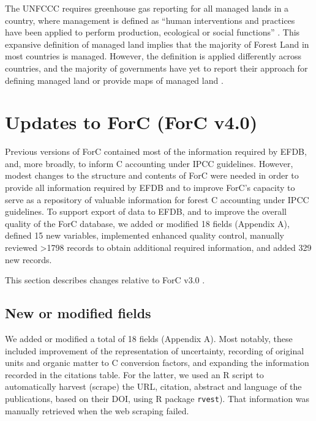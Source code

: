 \documentclass[, manuscript]{copernicus}
\begin{document}
The UNFCCC requires greenhouse gas reporting for all managed lands in a
country, where management is defined as ``human interventions and
practices have been applied to perform production, ecological or social
functions'' \citep{ipcc_2006_2006}. This expansive definition of managed
land implies that the majority of Forest Land in most countries is
managed. However, the definition is applied differently across
countries, and the majority of governments have yet to report their
approach for defining managed land or provide maps of managed land
\citep{ogle_delineating_2018, deng_comparing_2021}.

\section{Updates to ForC (ForC v4.0)}

Previous versions of ForC
\citep{anderson-teixeira_carbon_2016, anderson-teixeira_forc_2018, anderson-teixeira_carbon_2021}
contained most of the information required by EFDB, and, more broadly,
to inform C accounting under IPCC guidelines. However, modest changes to
the structure and contents of ForC were needed in order to provide all
information required by EFDB and to improve ForC's capacity to serve as
a repository of valuable information for forest C accounting under IPCC
guidelines. To support export of data to EFDB, and to improve the
overall quality of the ForC database, we added or modified 18 fields
(Appendix A), defined 15 new variables, implemented enhanced quality
control, manually reviewed \textgreater1798 records to obtain additional
required information, and added 329 new records.

This section describes changes relative to ForC v3.0
\citep{anderson-teixeira_carbon_2021}.

\subsection{New or modified fields}

We added or modified a total of 18 fields (Appendix A). Most notably,
these included improvement of the representation of uncertainty,
recording of original units and organic matter to C conversion factors,
and expanding the information recorded in the citations table. For the
latter, we used an R script to automatically harvest (scrape) the URL,
citation, abstract and language of the publications, based on their DOI,
using R package \texttt{rvest}\citep{rvest}). That information was
manually retrieved when the web scraping failed.
\end{document}
